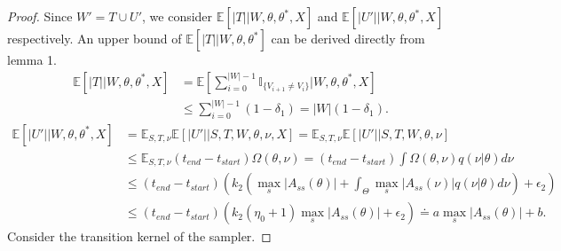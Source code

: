 \begin{proof}
Since $W' = T \cup U'$, we consider $\mathbb{E}[|T| | W, \theta, \theta^*, X]$ and $\mathbb{E}[|U'| | W, \theta, \theta^*, X]$ respectively.
An upper bound of $\mathbb{E}[|T| | W, \theta, \theta^*]$ can be derived directly from lemma 1.
\begin{align*}
\mathbb{E}[|T| | W, \theta, \theta^*, X] &= \mathbb{E}[\sum_{i = 0}^{|W| - 1} \mathbb{I}_{\{ V_{i + 1} \neq V_i \}}| W, \theta, \theta^*, X]\\
&\leq \sum_{i = 0}^{|W| - 1} (1 - \delta_1) = |W|(1 - \delta_1).
\end{align*}
\begin{align*}
\mathbb{E}[|U'| |W, \theta, \theta^*, X] &= \mathbb{E}_{S,T, \nu}\mathbb{E}[|U'| | S, T, W, \theta, \nu, X] = \mathbb{E}_{S,T, \nu}\mathbb{E}[|U'| | S, T, W, \theta, \nu] \\
& \leq \mathbb{E}_{S,T, \nu} (t_{end} - t_{start})\Omega(\theta, \nu) = (t_{end} - t_{start})\int \Omega(\theta, \nu) q(\nu | \theta) d\nu\\
& \leq (t_{end} - t_{start})( k_2 (  \max_s|A_{ss}(\theta)| +  \int_\Theta \max_s|A_{ss}(\nu)|q(\nu | \theta)d\nu ) + \epsilon_2) \\
& \leq (t_{end} - t_{start}) (k_2 (\eta_0 + 1) \max_s|A_{ss}(\theta)| + \epsilon_2) \doteq a \max_s|A_{ss}(\theta)| + b.
\end{align*}
Consider the transition kernel of the sampler.


\end{proof}
